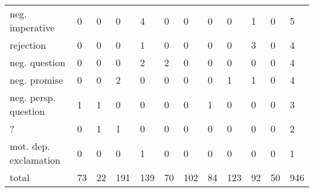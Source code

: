 \begin{screenonly}
\begin{table*}[h]
\begin{tabular*}{\hsize}{@{\extracolsep{\fill}}llllllllllll}
    neg. imperative & 0 & 0 & 0 & 4 & 0 & 0 & 0 & 0 & 1 & 0 & 5\\
    rejection & 0 & 0 & 0 & 1 & 0 & 0 & 0 & 0 & 3 & 0 & 4\\
    neg. question & 0 & 0 & 0 & 2 & 2 & 0 & 0 & 0 & 0 & 0 & 4\\
    neg. promise & 0 & 0 & 2 & 0 & 0 & 0 & 0 & 1 & 1 & 0 & 4\\
    neg. persp. question & 1 & 1 & 0 & 0 & 0 & 0 & 1 & 0 & 0 & 0 & 3\\
    ? & 0 & 1 & 1 & 0 & 0 & 0 & 0 & 0 & 0 & 0 & 2\\
    mot. dep. exclamation & 0 & 0 & 0 & 1 & 0 & 0 & 0 & 0 & 0 & 0 & 1\\
    \midrule
    total & 73 & 22 & 191 & 139 & 70 & 102 & 84 & 123 & 92 & 50 & 946\\
    \bottomrule
  \end{tabular*}
\end{table*}


\end{screenonly}
